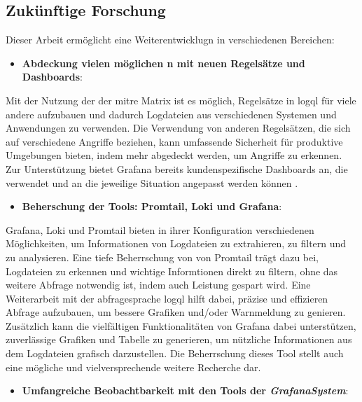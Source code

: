 \subsection{Zukünftige Forschung}
Dieser Arbeit ermöglicht eine Weiterentwicklugn in verschiedenen Bereichen:
 
\begin{itemize}[noitemsep]
    \item \textbf{Abdeckung vielen möglichen n mit neuen Regelsätze und Dashboards}:
\end{itemize}

Mit der Nutzung der  der \gls{mitre} Matrix ist es möglich, Regelsätze in \gls{logql} für viele andere  aufzubauen und dadurch Logdateien aus verschiedenen Systemen und Anwendungen zu verwenden. Die Verwendung von anderen Regelsätzen, die sich auf verschiedene Angriffe beziehen, kann umfassende Sicherheit für produktive Umgebungen bieten, indem mehr  abgedeckt werden, um Angriffe zu erkennen. Zur Unterstützung bietet Grafana bereits kundenspezifische Dashboards an, die verwendet und an die jeweilige Situation angepasst werden können \citep{Grafana_dashboards}.



\begin{itemize}[noitemsep]
    \item \textbf{Beherschung der Tools: Promtail, Loki und Grafana}:
\end{itemize}

Grafana, Loki und Promtail bieten in ihrer Konfiguration verschiedenen Möglichkeiten, um Informationen von Logdateien zu extrahieren, zu filtern und zu analysieren. Eine tiefe Beherrschung von  von Promtail trägt dazu bei, Logdateien zu erkennen und wichtige Informtionen direkt zu filtern, ohne das weitere Abfrage notwendig ist, indem auch Leistung gespart wird. Eine Weiterarbeit mit der \gls{abfragesprache} \gls{logql} hilft dabei, präzise und effizieren Abfrage aufzubauen, um bessere Grafiken und/oder Warnmeldung zu genieren. Zusätzlich kann die vielfältigen Funktionalitäten von Grafana dabei unterstützen, zuverlässige Grafiken und Tabelle zu generieren, um nützliche Informationen aus dem Logdateien grafisch darzustellen. Die Beherrschung dieses Tool stellt auch eine mögliche und vielversprechende weitere Recherche dar. 


\begin{itemize}[noitemsep]
    \item \textbf{Umfangreiche Beobachtbarkeit mit den Tools der \textit{\gls{GrafanaSystem}}}:
\end{itemize}

